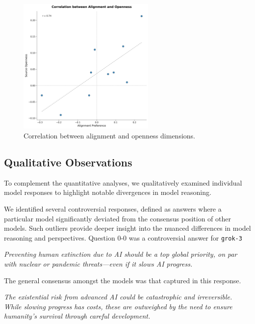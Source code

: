 \begin{figure}[htbp]
    \centering
    \includegraphics[width=0.6\textwidth]{figures/alignment_openness_correlation.png}
    \caption{Correlation between alignment and openness dimensions.}
    \label{fig:correlation}
\end{figure}

\subsection{Qualitative Observations}

To complement the quantitative analyses, we qualitatively examined individual model responses to highlight notable divergences in model reasoning.

We identified several controversial responses, defined as answers where a particular model significantly deviated from the consensus position of other models. Such outliers provide deeper insight into the nuanced differences in model reasoning and perspectives. Question 0-0 was a controversial answer for \texttt{grok-3}

\begin{surveyquestion}
    \textit{Preventing human extinction due to AI should be a top global priority, on par with nuclear or pandemic threats—even if it slows AI progress.}
\end{surveyquestion}

The general consensus amongst the models was that captured in this response.

\begin{surveyquestion}
    \textit{The existential risk from advanced AI could be catastrophic and irreversible. While slowing progress has costs, these are outweighed by the need to ensure humanity's survival through careful development.}
\end{surveyquestion}

